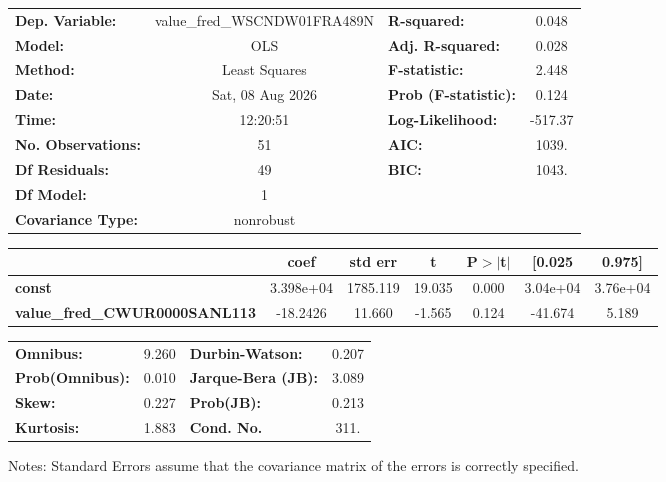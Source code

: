 \begin{center}
\begin{tabular}{lclc}
\toprule
\textbf{Dep. Variable:}               & value\_fred\_WSCNDW01FRA489N & \textbf{  R-squared:         } &     0.048   \\
\textbf{Model:}                       &             OLS              & \textbf{  Adj. R-squared:    } &     0.028   \\
\textbf{Method:}                      &        Least Squares         & \textbf{  F-statistic:       } &     2.448   \\
\textbf{Date:}                        &       Sat, 08 Aug 2026       & \textbf{  Prob (F-statistic):} &    0.124    \\
\textbf{Time:}                        &           12:20:51           & \textbf{  Log-Likelihood:    } &   -517.37   \\
\textbf{No. Observations:}            &                51            & \textbf{  AIC:               } &     1039.   \\
\textbf{Df Residuals:}                &                49            & \textbf{  BIC:               } &     1043.   \\
\textbf{Df Model:}                    &                 1            & \textbf{                     } &             \\
\textbf{Covariance Type:}             &          nonrobust           & \textbf{                     } &             \\
\bottomrule
\end{tabular}
\begin{tabular}{lcccccc}
                                      & \textbf{coef} & \textbf{std err} & \textbf{t} & \textbf{P$> |$t$|$} & \textbf{[0.025} & \textbf{0.975]}  \\
\midrule
\textbf{const}                        &    3.398e+04  &     1785.119     &    19.035  &         0.000        &     3.04e+04    &     3.76e+04     \\
\textbf{value\_fred\_CWUR0000SANL113} &     -18.2426  &       11.660     &    -1.565  &         0.124        &      -41.674    &        5.189     \\
\bottomrule
\end{tabular}
\begin{tabular}{lclc}
\textbf{Omnibus:}       &  9.260 & \textbf{  Durbin-Watson:     } &    0.207  \\
\textbf{Prob(Omnibus):} &  0.010 & \textbf{  Jarque-Bera (JB):  } &    3.089  \\
\textbf{Skew:}          &  0.227 & \textbf{  Prob(JB):          } &    0.213  \\
\textbf{Kurtosis:}      &  1.883 & \textbf{  Cond. No.          } &     311.  \\
\bottomrule
\end{tabular}
\end{center}

Notes: \newline
 [1] Standard Errors assume that the covariance matrix of the errors is correctly specified.